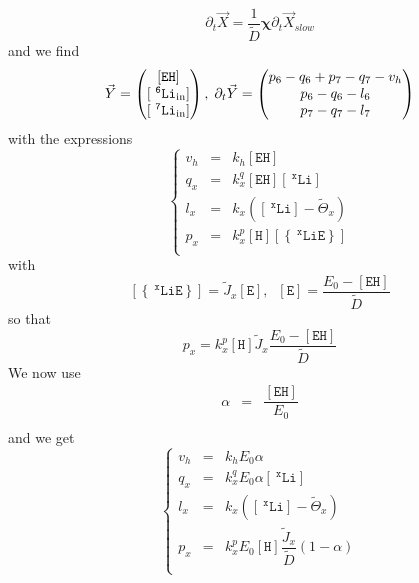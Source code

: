 \documentclass[aps,onecolumn,12pt]{revtex4}
\newcommand{\mychem}[1]{\mathtt{#1}}
\newcommand{\myconc}[1]{\left\lbrack{#1}\right\rbrack}
\newcommand{\spLi}[1]{{~^{\mychem{#1}}\mychem{Li}}}
\newcommand{\Li}[1]{\myconc{\spLi{#1}}}
\newcommand{\spEout}{\mychem{E}}
\newcommand{\Eout}{\myconc{\spEout}}
\newcommand{\spLiE}[1]{\left\lbrace\spLi{#1}\spEout\right\rbrace}
\newcommand{\LiE}[1]{\myconc{\spLiE{#1}}}
\newcommand{\spLiIn}[1]{{\spLi{#1}}_{\mathrm{in}}}
\newcommand{\LiIn}[1]{\myconc{\spLiIn{#1}}}
\newcommand{\spEHin}{\mychem{EH}}
\newcommand{\EHin}{\myconc{\spEHin}}
\newcommand{\spproton}{\mychem{H}}
\newcommand{\proton}{\myconc{\spproton}}
\newcommand{\mymat}[1]{{\bm{#1}}}
\begin{document}
\begin{equation}
	\partial_t\vec{X} = \dfrac{1}{\tilde{D}}
	\mymat{\chi} \partial_t\vec{X}_{slow}
\end{equation}
and we find
\begin{equation}
	\vec{Y} = \begin{pmatrix} \EHin \cr \LiIn{6} \cr \LiIn{7} \end{pmatrix}
	,\;\partial_t \vec{Y} = 
	\begin{pmatrix}
	p_6-q_6+p_7-q_7-v_h\\
	p_6-q_6-l_6\\
	p_7-q_7-l_7
	\end{pmatrix}
\end{equation}
with the expressions
\begin{equation}
\left\lbrace
	\begin{array}{rcl}
	v_h & = & k_h \EHin \\
	q_x & = & k_x^q \EHin \Li{x}  \\
	l_x & = & k_x  \left(\Li{x}- \tilde{\Theta}_x\right)\\
	p_x & = & k_x^p \proton \LiE{x}\\
	\end{array}
\right.
\end{equation}
with
\begin{equation}
	\LiE{x} = \tilde{J}_x \Eout,\;\;\Eout=\dfrac{E_0-\EHin}{\tilde{D}}
\end{equation}
so that
\begin{equation}
	p_x = k_x^p \proton  \tilde{J}_x \dfrac{E_0-\EHin}{\tilde{D}}
\end{equation}
We now use
\begin{equation}
	\begin{array}{rcl}
	\alpha    & = &\dfrac{\EHin}{E_0}\\
	\end{array}
\end{equation}
and we get
\begin{equation}
	\left\lbrace
	\begin{array}{rcl}
	v_h & = & k_h E_0 \alpha \\
	q_x & = & k_x^q E_0 \alpha \Li{x}  \\
	l_x & = & k_x \left(\Li{x} - \tilde{\Theta}_x\right)\\
	p_x & = & k_x^p E_0 \proton \dfrac{\tilde{J}_x}{\tilde{D}}(1-\alpha) \\
	\end{array}
\right.
\end{equation}
\end{document}
